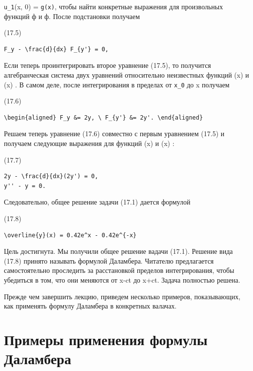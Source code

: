 \documentclass[
  ukrainian,
]{article}
\begin{document}
\texttt{u\_1}(x, 0) = \texttt{g(x)}, чтобы найти конкретные выражения
для произвольных функций ф и ф. После подстановки получаем

(17.5)

\begin{verbatim}
F_y - \frac{d}{dx} F_{y'} = 0,
\end{verbatim}

Если теперь проинтегрировать второе уравнение (17.5), то получится
алгебранческая система двух уравнений относительно неизвестных функций
\varphi(x) и \psi(x) . В самом деле, после интегрирования в пределах от
\texttt{x\_0} до x получаем

(17.6)

\begin{verbatim}
\begin{aligned} F_y &= 2y, \ F_{y'} &= 2y'. \end{aligned}
\end{verbatim}

Решаем теперь уравнение (17.6) совместно с первым уравнением (17.5) и
получаем следующие выражения для функций \varphi(x) и \psi(x) :

(17.7)

\begin{verbatim}
2y - \frac{d}{dx}(2y') = 0,
y'' - y = 0.
\end{verbatim}

Следовательно, общее решение задачи (17.1) дается формулой

(17.8)

\begin{verbatim}
\overline{y}(x) = 0.42e^x - 0.42e^{-x}
\end{verbatim}

Цель достигнута. Мы получили общее решение вадачи (17.1). Решение вида
(17.8) принято называть формулой Даламбера. Читателю предлагается
самостоятельно проследить за расстановкой пределов интегрирования, чтобы
убедиться в том, что они меняются от x-ct до x+ct. Задача полностью
решена.

Прежде чем завершить лекцию, приведем несколько примеров, показывающих,
как применять формулу Даламбера в конкретных валачах.

\section{Примеры применения формулы
Даламбера}\label{ux43fux440ux438ux43cux435ux440ux44b-ux43fux440ux438ux43cux435ux43dux435ux43dux438ux44f-ux444ux43eux440ux43cux443ux43bux44b-ux434ux430ux43bux430ux43cux431ux435ux440ux430}
\end{document}
